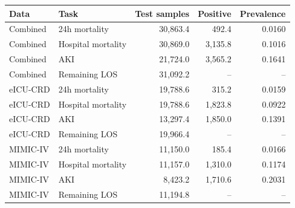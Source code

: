 \begin{tabular}{llrrr}
\toprule
Data & Task & Test samples & Positive & Prevalence \\
\midrule
Combined & 24h mortality & 30,863.4 & 492.4 & 0.0160 \\
Combined & Hospital mortality & 30,869.0 & 3,135.8 & 0.1016 \\
Combined & AKI & 21,724.0 & 3,565.2 & 0.1641 \\
Combined & Remaining LOS & 31,092.2 & -- & -- \\
eICU-CRD & 24h mortality & 19,788.6 & 315.2 & 0.0159 \\
eICU-CRD & Hospital mortality & 19,788.6 & 1,823.8 & 0.0922 \\
eICU-CRD & AKI & 13,297.4 & 1,850.0 & 0.1391 \\
eICU-CRD & Remaining LOS & 19,966.4 & -- & -- \\
MIMIC-IV & 24h mortality & 11,150.0 & 185.4 & 0.0166 \\
MIMIC-IV & Hospital mortality & 11,157.0 & 1,310.0 & 0.1174 \\
MIMIC-IV & AKI & 8,423.2 & 1,710.6 & 0.2031 \\
MIMIC-IV & Remaining LOS & 11,194.8 & -- & -- \\
\bottomrule
\end{tabular}
